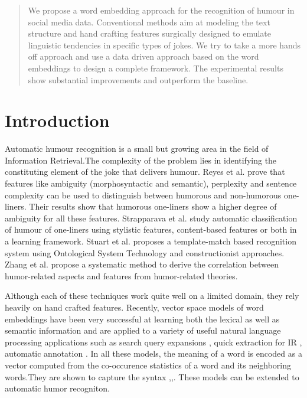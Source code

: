 \documentclass{acm_proc_article-sp}
\begin{document}
\renewcommand\Authands{ and }





\maketitle
\begin{abstract}

We propose a word embedding approach for the recognition of humour in social media data. Conventional methods aim at modeling the text structure and hand crafting features surgically designed to emulate linguistic tendencies in specific types of jokes. We try to take a more hands off approach and use a data driven approach based on the word embeddings to design a complete framework. The experimental results show substantial improvements and outperform the baseline.
\end{abstract}





\section{Introduction}
Automatic humour recognition is a small but growing area in the field of Information Retrieval.The complexity of the problem lies in identifying the constituting element of the joke that delivers humour. Reyes et al. \cite{reyes2010evaluating} prove that features like ambiguity (morphosyntactic and semantic), perplexity and sentence complexity can be used to distinguish between humorous and non-humorous one-liners. Their results show that humorous one-liners show a higher degree of ambiguity for all these features. Strapparava et al.\cite{stock2006automatic} study automatic classification of humour of one-liners using stylistic features, content-based features or both in a learning framework. Stuart et al. \cite{stuart2012constructions} proposes a template-match based recognition system using Ontological System Technology and constructionist approaches. Zhang et al. \cite{zhang2014recognizing} propose a systematic method to derive the correlation between humor-related aspects and features from humor-related theories. 

Although each of these techniques work quite well on a limited domain, they rely heavily on hand crafted features. Recently, vector space models of word embeddings have been very successful at learning both the lexical as well as semantic information and are applied to a variety of useful natural language processing applications such as search query expansions \cite{jones2006generating}, quick extraction for IR \cite{pacsca2006names}, automatic annotation \cite{ratinov2011local}. In all these models, the meaning of a word is encoded as a vector computed from the co-occurence statistics of a word and its neighboring words.They are shown to capture the syntax \cite{mikolov2013efficient},\cite{huang2012improving},\cite{turian2010word}. These models can be extended to automatic humor recogniton. 
\end{document}
